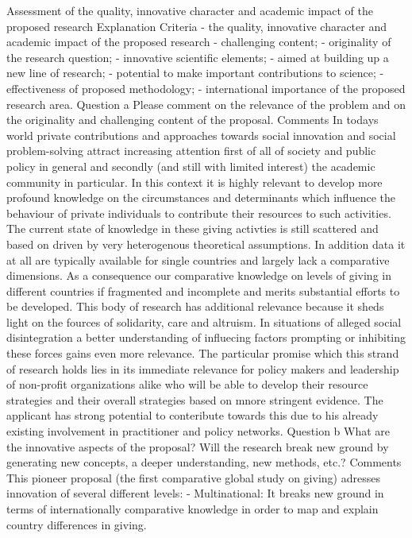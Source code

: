 \documentclass[twocolumn, serif, rga, numeric]{jote-article}
\begin{document}
Assessment of the quality, innovative character and academic impact of the proposed research
Explanation
Criteria - the quality, innovative character and academic impact of the proposed research - challenging content; - originality of the research question; - innovative scientific elements; - aimed at building up a new line of research; - potential to make important contributions to science; - effectiveness of proposed methodology; - international importance of the proposed research area.
Question a
Please comment on the relevance of the problem and on the originality and challenging content of the proposal.
Comments
In todays world private contributions and approaches towards social innovation and social problem-solving attract increasing attention first of all of society and public policy in general and secondly (and still with limited interest) the academic community in particular. In this context it is highly relevant to develop more profound knowledge on the circumstances and determinants which influence the behaviour of private individuals to contribute their resources to such activities. The current state of knowledge in these giving activties is still scattered and based on driven by very heterogenous theoretical assumptions. In addition data it at all are typically available for single countries and largely lack a comparative dimensions. As a consequence our comparative knowledge on levels of giving in different countries if fragmented and incomplete and merits substantial efforts to be developed.
This body of research has additional relevance because it sheds light on the fources of solidarity, care and altruism. In situations of alleged social disintegration a better understanding of influecing factors prompting or inhibiting these forces gains even more relevance.
The particular promise which this strand of research holds lies in its immediate relevance for policy makers and leadership of non-profit organizations alike who will be able to develop their resource strategies and their overall strategies based on mnore stringent evidence. The applicant has strong potential to conteribute towards this due to his already existing involvement in practitioner and policy networks.
Question b
What are the innovative aspects of the proposal? Will the research break new ground by generating new concepts, a deeper understanding, new methods, etc.?
Comments
This pioneer proposal (the first comparative global study on giving) adresses innovation of several different levels:
- Multinational: It breaks new ground in terms of internationally comparative knowledge in order to map and explain country differences in giving.
\end{document}
